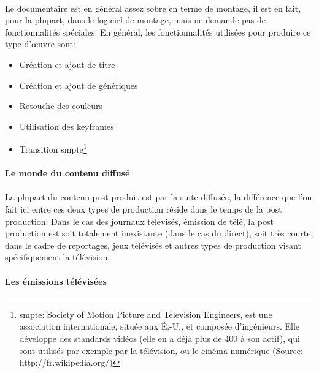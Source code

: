 \paragraph{}
Le documentaire est en général assez sobre en terme de montage, il est en
fait, pour la plupart, dans le logiciel de montage, mais ne demande pas
de fonctionnalités spéciales. En général, les fonctionnalités utilisées
pour produire ce type d'œuvre sont:
\begin{itemize} \setlength{\itemsep}{2mm}
  \item{Création et ajout de titre}
  \item{Création et ajout de génériques}
  \item{Retouche des couleurs}
  \item{Utilisation des keyframes}
  \item{Transition smpte\footnote{smpte: Society of Motion Picture
    and Television Engineers, est une association internationale,
    située aux É.-U., et composée d'ingénieurs. Elle développe
    des standards vidéos (elle en a déjà plus de 400 à son actif),
    qui sont utilisés par exemple par la télévision, ou le cinéma numérique
    (Source: http://fr.wikipedia.org/)}}
\end{itemize}

\paragraph{Le monde du contenu diffusé}

\paragraph{}

La plupart du contenu post produit est par la suite diffusée, la différence que l'on
fait ici entre ces deux types de production réside dans le temps de la post production.
Dans le cas des journaux télévisés, émission de télé, la post production est soit totalement
inexistante (dans le cas du direct), soit très courte, dans le cadre de reportages, jeux télévisés
et autres types de production visant spécifiquement la télévision.

\paragraph {Les émissions télévisées}

\paragraph{}

